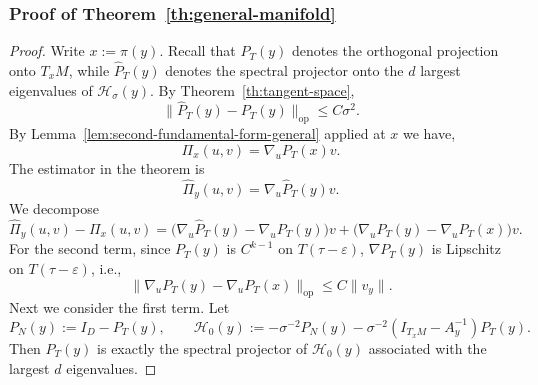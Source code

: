\documentclass[11pt]{article}
\theoremstyle{plain}
\theoremstyle{definition}
\begin{document}
\subsubsection{Proof of Theorem~\ref{th:general-manifold}}\label{sec:pf-general manifold}
\begin{proof}
Write $x:=\pi(y)$. Recall that $P_T(y)$ denotes the orthogonal projection onto $T_xM$, while $\widehat P_T(y)$ denotes the spectral projector onto the $d$ largest eigenvalues of $\mathcal{H}_\sigma(y)$. By Theorem~\ref{th:tangent-space},
\[
\|\widehat P_T(y)-P_T(y)\|_{\mathrm{op}}
\le C\sigma^2.
\] 
By Lemma~\ref{lem:second-fundamental-form-general} applied at $x$ we have,
\[
\Pi_x(u,v) = \nabla_uP_T(x)v.
\]
The estimator in the theorem is
\[
\widehat\Pi_y(u,v)
=
\nabla_u\widehat P_T(y)v.
\]
We decompose
\[
\widehat\Pi_y(u,v)-\Pi_x(u,v)
=
\big(\nabla_u\widehat P_T(y)-\nabla_uP_T(y)\big)v
+
\big(\nabla_uP_T(y)-\nabla_uP_T(x)\big)v.
\]
For the second term, since $P_T(y)$ is $C^{k-1}$ on $T(\tau-\varepsilon)$, $\nabla P_T(y)$ is Lipschitz on $T(\tau-\varepsilon)$, i.e.,
\[
\|\nabla_uP_T(y)-\nabla_uP_T(x)\|_{\mathrm{op}}
\le C\|v_y\|.
\]
Next we consider the first term. Let
\[
P_N(y):=I_D-P_T(y),
\qquad
\mathcal H_0(y):= -\sigma^{-2}P_N(y)-\sigma^{-2}(I_{T_xM}-A_y^{-1})P_T(y).
\]
Then $P_T(y)$ is exactly the spectral projector of $\mathcal H_0(y)$ associated with the largest $d$ eigenvalues.


\end{proof}
\end{document}
